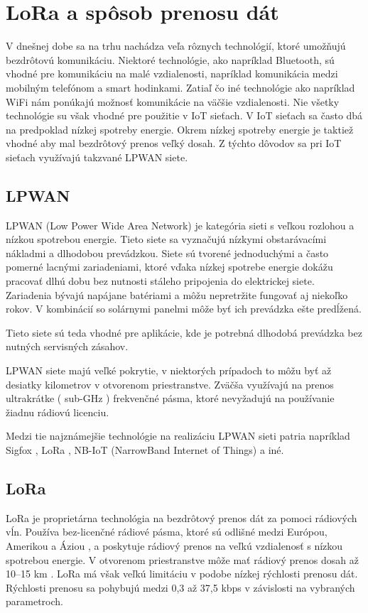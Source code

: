 \documentclass[slovak,master]{diploma}
\begin{document}
\chapter{LoRa a spôsob prenosu dát}
V dnešnej dobe sa na trhu nachádza veľa rôznych technológií, ktoré umožňujú bezdrôtovú komunikáciu. Niektoré technológie, ako napríklad Bluetooth, sú vhodné pre komunikáciu na malé 
vzdialenosti, napríklad komunikácia medzi mobilným telefónom a smart hodinkami. Zatiaľ čo iné technológie ako napríklad WiFi nám ponúkajú možnosť komunikácie na väčšie vzdialenosti. 
Nie všetky technológie su však vhodné pre použitie v IoT sieťach. V IoT sieťach sa často dbá na predpoklad nízkej spotreby energie. Okrem nízkej spotreby energie je taktiež vhodné 
aby mal bezdrôtový prenos veľký dosah. Z týchto dôvodov sa pri IoT sieťach využívajú takzvané LPWAN siete.
\section {LPWAN}
LPWAN (Low Power Wide Area Network) je kategória sieti s veľkou rozlohou a nízkou spotrebou energie. Tieto siete sa vyznačujú nízkymi obstarávacími 
nákladmi a dlhodobou prevádzkou. Siete sú tvorené jednoduchými a často pomerné lacnými zariadeniami, ktoré vďaka nízkej spotrebe energie dokážu pracovať dlhú dobu bez 
nutnosti stáleho pripojenia do elektrickej siete. Zariadenia bývajú napájane batériami a môžu nepretržite fungovať aj niekoľko rokov. V kombinácií so solárnymi panelmi 
môže byť ich prevádzka ešte predĺžená. 

Tieto siete sú teda vhodné pre aplikácie, kde je potrebná dlhodobá prevádzka bez nutných servisných zásahov.

LPWAN siete majú veľké pokrytie, v niektorých prípadoch to môžu byť až desiatky kilometrov v otvorenom priestranstve. Zväčša využívajú na prenos 
ultrakrátke ( sub-GHz ) frekvenčné pásma, ktoré nevyžadujú na používanie žiadnu rádiovú licenciu.

Medzi tie najznámejšie technológie na realizáciu LPWAN sieti patria napríklad Sigfox \cite{sigfox}, LoRa \cite{lora}, NB-IoT (NarrowBand Internet of Things) a iné.

\section {LoRa}
LoRa je proprietárna technológia na bezdrôtový prenos dát za pomoci rádiových vĺn.
Používa bez-licenčné rádiové pásma, ktoré sú odlišné medzi Európou, Amerikou a Áziou \cite{loraRegionalParameters}, a poskytuje rádiový prenos na veľkú vzdialenosť s nízkou spotrebou energie.
V otvorenom priestranstve môže mať rádiový prenos dosah až 10--15 km \cite{loraDoc}. LoRa má však veľkú limitáciu v podobe nízkej rýchlosti prenosu dát.
Rýchlosti prenosu sa pohybujú medzi 0,3 až 37,5 kbps v závislosti na vybraných parametroch.
\end{document}
